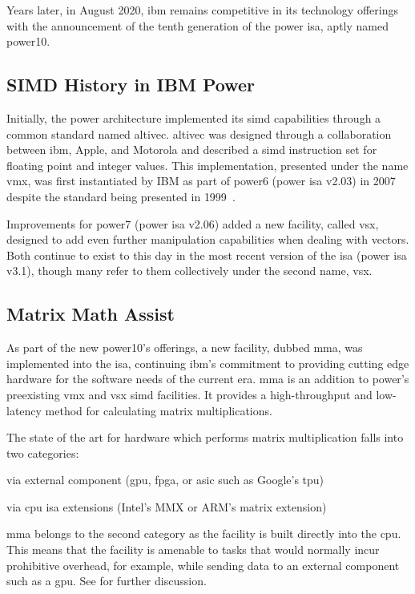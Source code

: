 \documentclass[\main/thesis.tex]{subfiles}
\begin{document}
Years later, in August 2020, \gls{ibm} remains competitive in its technology offerings with the announcement of the tenth generation of the \gls{power} \gls{isa}, aptly named \gls{power10}.

\subsection{SIMD History in IBM Power}
Initially, the \gls{power} architecture implemented its \gls{simd} capabilities through a common standard named \gls{altivec}.
\Gls{altivec} was designed through a collaboration between \gls{ibm}, Apple, and Motorola and described a \gls{simd} instruction set for floating point and integer values.
This implementation, presented under the name \gls{vmx}, was first instantiated by IBM as part of \gls{power}6 (\gls{power} \gls{isa} v2.03) in 2007~\autocite{eisen2007ibm} despite the standard being presented in 1999~\autocite{tyler1999altivec}.

Improvements for \gls{power}7 (\gls{power} \gls{isa} v2.06) added a new facility, called \gls{vsx}, designed to add even further manipulation capabilities when dealing with vectors.
Both continue to exist to this day in the most recent version of the \gls{isa} (\gls{power} \gls{isa} v3.1), though many refer to them collectively under the second name, \gls{vsx}.

\subsection{Matrix Math Assist}
\label{sec:mmaintro}
As part of the new \gls{power10}'s offerings, a new facility, dubbed \gls{mma}, was implemented into the \gls{isa}, continuing \gls{ibm}'s commitment to providing cutting edge hardware for the software needs of the current era.
\gls{mma} is an addition to \gls{power}'s preexisting \gls{vmx} and \gls{vsx} \gls{simd} facilities.
It provides a high-throughput and low-latency method for calculating matrix multiplications.

The state of the art for hardware which performs matrix multiplication falls into two categories:
\begin{enumerate*}[itemjoin*={{ and }}, label=\textbf{(\arabic*)}, after={.}]
  \item via external component (\eg \gls{gpu}, \gls{fpga}, or \gls{asic} such as Google's \gls{tpu})
  \item via \gls{cpu} \gls{isa} extensions (\eg Intel's MMX or ARM's matrix extension)
\end{enumerate*}
\Gls{mma} belongs to the second category as the facility is built directly into the \gls{cpu}.
This means that the facility is amenable to tasks that would normally incur prohibitive overhead, for example, while sending data to an external component such as a \gls{gpu}.
See  for further discussion.
\end{document}

